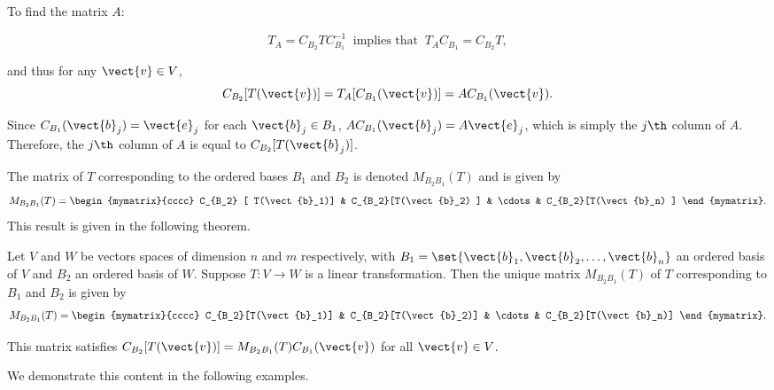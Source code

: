 To find the matrix $A$:

\[ T_A=C_{B_2}TC_{B_1}^{-1}~\mbox{ implies that }~
T_AC_{B_1}=C_{B_2}T,\]

and thus for any $\vect{v}\in V$,
\[ C_{B_2}[T(\vect{v})] = T_A[C_{B_1}(\vect{v})]
=AC_{B_1}(\vect{v}).\]

Since $C_{B_1}(\vect{b}_j)=\vect{e}_j$
for each $\vect{b}_j\in B_1$,
$AC_{B_1}(\vect{b}_j)=A\vect{e}_j$, which is simply the
$j\th$ column of $A$.
Therefore, the $j\th$ column of $A$ is equal to $C_{B_2}[T(\vect{b}_j)]$.

The matrix of $T$ corresponding to the ordered
bases $B_1$ and $B_2$ is denoted $ M_{B_2B_1}(T)$ and is given by
\[ M_{B_2B_1}(T)=
\begin{mymatrix}{cccc}
C_{B_2} [ T(\vect{b}_1)] & C_{B_2}[T(\vect{b}_2) ] &
\cdots & C_{B_2}[T(\vect{b}_n) ] \end{mymatrix}.\]
This result is given in the following theorem.

\begin{theorem}{}{}
Let $V$ and $W$ be vectors spaces of dimension
$n$ and $m$ respectively, with $B_1=\set{\vect{b}_1, \vect{b}_2, \ldots, \vect{b}_n}$ an
ordered basis of $V$ and $B_2$ an ordered basis of $W$. Suppose $T:V\to W$ is a linear transformation. Then the unique matrix $M_{B_2B_1}(T)$ of $T$ corresponding to $B_1$ and $B_2$ is given by
\[ M_{B_2B_1}(T)=
\begin{mymatrix}{cccc}
C_{B_2}[T(\vect{b}_1)] & C_{B_2}[T(\vect{b}_2)] &
\cdots & C_{B_2}[T(\vect{b}_n)] \end{mymatrix}.\]

This matrix satisfies  $C_{B_2}[T(\vect{v})]=M_{B_2B_1}(T)C_{B_1}(\vect{v})$ for all $\vect{v}\in V$.
\end{theorem}

We demonstrate this content in the following examples.


